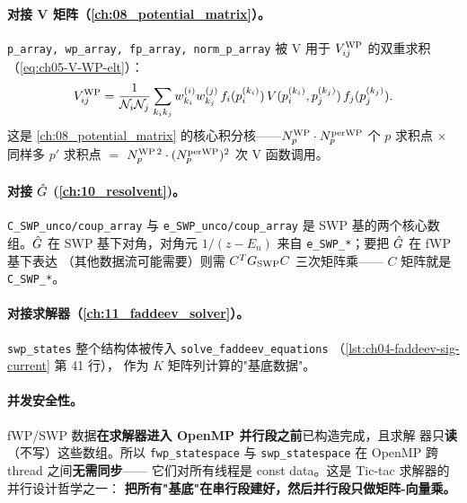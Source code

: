 \paragraph{对接 V 矩阵（\cref{ch:08_potential_matrix}）。}
\texttt{p\_array, wp\_array, fp\_array, norm\_p\_array} 被 V 用于
\(V_{ij}^{\rm WP}\) 的双重求积（\cref{eq:ch05-V-WP-elt}）：
\begin{equation*}
V_{ij}^{\rm WP}
= \frac{1}{\mathcal{N}_i \mathcal{N}_j}
\sum_{k_i k_j} w_{k_i}^{(i)} w_{k_j}^{(j)}\,
   f_i(p_i^{(k_i)})\,V(p_i^{(k_i)}, p_j^{(k_j)})\,f_j(p_j^{(k_j)}).
\end{equation*}
这是 \cref{ch:08_potential_matrix} 的核心积分核——\({N_{p}^{\text{WP}}} \cdot
N_p^{\rm per WP}\) 个 \(p\) 求积点 \(\times\) 同样多 \(p'\) 求积点
\(=\) \(N_p^{\rm WP\,2} \cdot (N_p^{\rm per WP})^2\) 次 V 函数调用。

\paragraph{对接 \(\hat{G}\) (\cref{ch:10_resolvent})。}
\texttt{C\_SWP\_unco/coup\_array} 与 \texttt{e\_SWP\_unco/coup\_array} 是
SWP 基的两个核心数组。\(\hat{G}\) 在 SWP 基下对角，对角元
\(1/(z - E_n)\) 来自 \texttt{e\_SWP\_*}；要把 \(\hat{G}\) 在 fWP 基下表达
（其他数据流可能需要）则需 \(C^T G_{\rm SWP} C\) 三次矩阵乘——
\(C\) 矩阵就是 \texttt{C\_SWP\_*}。

\paragraph{对接求解器（\cref{ch:11_faddeev_solver}）。}
\texttt{swp\_states} 整个结构体被传入 \texttt{solve\_faddeev\_equations}
（\cref{lst:ch04-faddeev-sig-current} 第 41 行），
作为 \(K\) 矩阵列计算的"基底数据"。

\paragraph{并发安全性。}
fWP/SWP 数据\textbf{在求解器进入 OpenMP 并行段之前}已构造完成，且求解
器只\textbf{读}（不写）这些数组。所以 \texttt{fwp\_statespace} 与
\texttt{swp\_statespace} 在 OpenMP 跨 thread 之间\textbf{无需同步}——
它们对所有线程是 const data。这是 Tic-tac 求解器的并行设计哲学之一：
\textbf{把所有"基底"在串行段建好，然后并行段只做矩阵-向量乘。}

